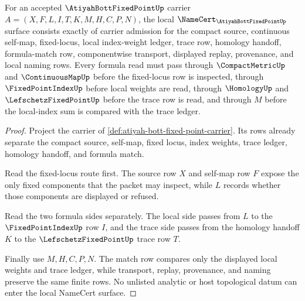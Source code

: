 \begin{theorem}
\label{thm:atiyah-bott-fixed-point-namecert-obligations}
For an accepted $\AtiyahBottFixedPointUp$ carrier $A=(X,F,L,I,T,K,M,H,C,P,N)$, the local $\NameCert_{\AtiyahBottFixedPointUp}$ surface consists exactly of carrier admission for the compact source, continuous self-map, fixed-locus, local index-weight ledger, trace row, homology handoff, formula-match row, componentwise transport, displayed replay, provenance, and local naming rows. Every formula read must pass through $\CompactMetricUp$ and $\ContinuousMapUp$ before the fixed-locus row is inspected, through $\FixedPointIndexUp$ before local weights are read, through $\HomologyUp$ and $\LefschetzFixedPointUp$ before the trace row is read, and through $M$ before the local-index sum is compared with the trace ledger.
\end{theorem}
\begin{proof}
Project the carrier of \autoref{def:atiyah-bott-fixed-point-carrier}. Its rows already separate the compact source, self-map, fixed locus, index weights, trace ledger, homology handoff, and formula match.

Read the fixed-locus route first. The source row $X$ and self-map row $F$ expose the only fixed components that the packet may inspect, while $L$ records whether those components are displayed or refused.

Read the two formula sides separately. The local side passes from $L$ to the $\FixedPointIndexUp$ row $I$, and the trace side passes from the homology handoff $K$ to the $\LefschetzFixedPointUp$ trace row $T$.

Finally use $M,H,C,P,N$. The match row compares only the displayed local weights and trace ledger, while transport, replay, provenance, and naming preserve the same finite rows. No unlisted analytic or host topological datum can enter the local NameCert surface.
\end{proof}

